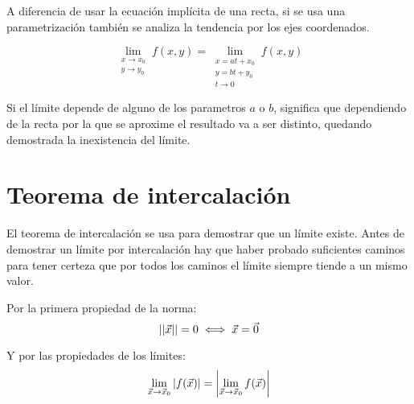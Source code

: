 \documentclass[a5paper,12pt,twoside]{book}
\begin{document}
A diferencia de usar la ecuación implícita de una recta, si se usa una parametrización también se analiza la tendencia por los ejes coordenados.

\begin{equation*}
    \lim_{\substack{x \to x_0\\y \to y_0}} f(x,y)
    = \lim_{\substack{x=at+x_0\\y=bt+y_0\\t \to 0}} f(x,y)
\end{equation*}

Si el límite depende de alguno de los parametros $a$ o $b$, significa que dependiendo de la recta por la que se aproxime el resultado va a ser distinto, quedando demostrada la inexistencia del límite.







\section{Teorema de intercalación}

El teorema de intercalación se usa para demostrar que un límite existe. Antes de demostrar un límite por intercalación hay que haber probado suficientes caminos para tener certeza que por todos los caminos el límite siempre tiende a un mismo valor.

Por la primera propiedad de la norma:
\begin{equation*}
    {\left|\left| {\Vec{x}} \right|\right|} = 0 \iff \Vec{x} = \Vec{0}
\end{equation*}

Y por las propiedades de los límites:
\begin{equation*}
    \displaystyle\lim_{\Vec{x} \to \Vec{x}_0} {\left| {f(\Vec{x})} \right|}
    = {\left| {\displaystyle\lim_{\Vec{x} \to \Vec{x}_0} f(\Vec{x})} \right|}
\end{equation*}
\end{document}
